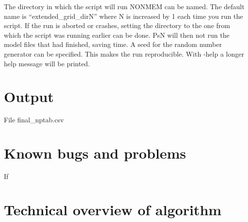 \begin{optionlist}
The directory in which the script will run NONMEM can be named. The default name is “extended\_grid\_dirN” where N is increased by 1 each time you run the script. If the run is aborted or crashes, setting the directory to the one from which the script was running earlier can be done. PsN will then not run the model files that had finished, saving time. 
\nextopt
{}
A seed for the random number generator can be specified. This makes the run reproducible.   
\nextopt
{}
With -help a longer help message will be printed. 
\nextopt
\end{optionlist}


\section{Output}

File final\_nptab.csv

\section{Known bugs and problems}

If

\section{Technical overview of algorithm}

